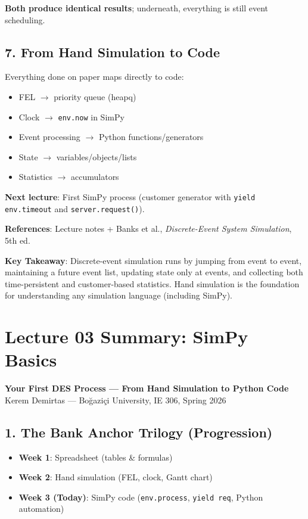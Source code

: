 \documentclass[11pt]{article}
\begin{document}
\textbf{Both produce identical results}; underneath, everything is still event scheduling.

\subsection*{7. From Hand Simulation to Code}
Everything done on paper maps directly to code:
\begin{itemize}[leftmargin=*]
\item FEL $\rightarrow$ priority queue (heapq)
\item Clock $\rightarrow$ \texttt{env.now} in SimPy
\item Event processing $\rightarrow$ Python functions/generators
\item State $\rightarrow$ variables/objects/lists
\item Statistics $\rightarrow$ accumulators
\end{itemize}

\textbf{Next lecture}: First SimPy process (customer generator with \texttt{yield env.timeout} and \texttt{server.request()}).

\textbf{References}: Lecture notes + Banks et al., \textit{Discrete-Event System Simulation}, 5th ed.

\textbf{Key Takeaway}: Discrete-event simulation runs by jumping from event to event, maintaining a future event list, updating state only at events, and collecting both time-persistent and customer-based statistics. Hand simulation is the foundation for understanding any simulation language (including SimPy).

\section*{Lecture 03 Summary: SimPy Basics}
\textbf{Your First DES Process --- From Hand Simulation to Python Code}
Kerem Demirtas --- Boğaziçi University, IE 306, Spring 2026

\subsection*{1. The Bank Anchor Trilogy (Progression)}
\begin{itemize}[leftmargin=*]
\item \textbf{Week 1}: Spreadsheet (tables \& formulas)  
\item \textbf{Week 2}: Hand simulation (FEL, clock, Gantt chart)  
\item \textbf{Week 3 (Today)}: SimPy code (\texttt{env.process}, \texttt{yield req}, Python automation)  
\end{itemize}
\end{document}
